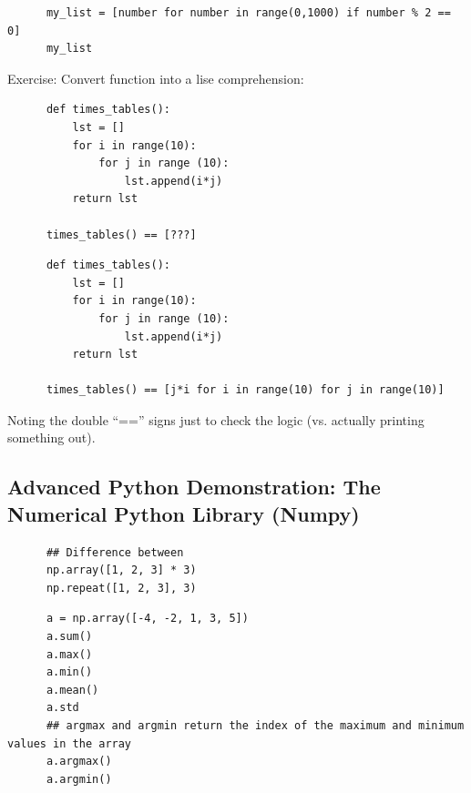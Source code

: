 \documentclass[11pt]{article}
\begin{document}
    \begin{lstlisting}
      my_list = [number for number in range(0,1000) if number % 2 == 0]
      my_list
    \end{lstlisting}

    Exercise: Convert function into a lise comprehension:
    \begin{lstlisting}
      def times_tables():
          lst = []
          for i in range(10):
              for j in range (10):
                  lst.append(i*j)
          return lst
      
      times_tables() == [???]
    \end{lstlisting}

    \begin{lstlisting}
      def times_tables():
          lst = []
          for i in range(10):
              for j in range (10):
                  lst.append(i*j)
          return lst

      times_tables() == [j*i for i in range(10) for j in range(10)]
    \end{lstlisting}
    Noting the double ``=='' signs just to check the logic (vs. actually printing something out). 


    \newpage    
    \subsection{Advanced Python Demonstration: The Numerical Python Library (Numpy)}
    \begin{lstlisting}
      ## Difference between 
      np.array([1, 2, 3] * 3) 
      np.repeat([1, 2, 3], 3)
    \end{lstlisting}

    \begin{lstlisting}
      a = np.array([-4, -2, 1, 3, 5])
      a.sum()
      a.max()
      a.min()
      a.mean()
      a.std
      ## argmax and argmin return the index of the maximum and minimum values in the array
      a.argmax()
      a.argmin()
    \end{lstlisting}
\end{document}

